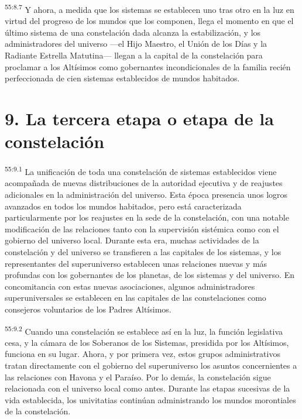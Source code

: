 \par
\textsuperscript{55:8.7} Y ahora, a medida que los sistemas se establecen uno tras otro en la luz en virtud del progreso de los mundos que los componen, llega el momento en que el último sistema de una constelación dada alcanza la estabilización, y los administradores del universo ---el Hijo Maestro, el Unión de los Días y la Radiante Estrella Matutina--- llegan a la capital de la constelación para proclamar a los Altísimos como gobernantes incondicionales de la familia recién perfeccionada de cien sistemas establecidos de mundos habitados.

\section*{9. La tercera etapa o etapa de la constelación}
\par
\textsuperscript{55:9.1} La unificación de toda una constelación de sistemas establecidos viene acompañada de nuevas distribuciones de la autoridad ejecutiva y de reajustes adicionales en la administración del universo. Esta época presencia unos logros avanzados en todos los mundos habitados, pero está caracterizada particularmente por los reajustes en la sede de la constelación, con una notable modificación de las relaciones tanto con la supervisión sistémica como con el gobierno del universo local. Durante esta era, muchas actividades de la constelación y del universo se transfieren a las capitales de los sistemas, y los representantes del superuniverso establecen unas relaciones nuevas y más profundas con los gobernantes de los planetas, de los sistemas y del universo. En concomitancia con estas nuevas asociaciones, algunos administradores superuniversales se establecen en las capitales de las constelaciones como consejeros voluntarios de los Padres Altísimos.

\par
\textsuperscript{55:9.2} Cuando una constelación se establece así en la luz, la función legislativa cesa, y la cámara de los Soberanos de los Sistemas, presidida por los Altísimos, funciona en su lugar. Ahora, y por primera vez, estos grupos administrativos tratan directamente con el gobierno del superuniverso los asuntos concernientes a las relaciones con Havona y el Paraíso. Por lo demás, la constelación sigue relacionada con el universo local como antes. Durante las etapas sucesivas de la vida establecida, los univitatias continúan administrando los mundos morontiales de la constelación.

